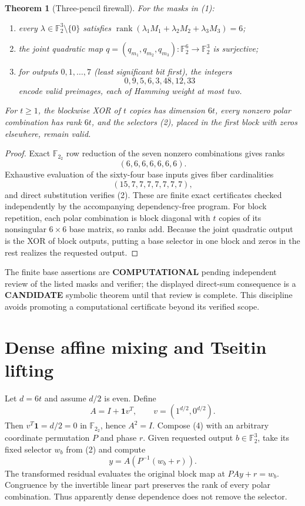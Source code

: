 \documentclass[11pt]{article}
\newtheorem{theorem}{Theorem}
\newcommand{\F}{\mathbb F_2}
\newcommand{\COMP}{\textbf{COMPUTATIONAL}}
\newcommand{\CAND}{\textbf{CANDIDATE}}
\begin{document}
\begin{theorem}[Three-pencil firewall]
For the masks in (1):
\begin{enumerate}
\item every $\lambda\in\F^3\setminus\{0\}$ satisfies
$\operatorname{rank}(\lambda_1M_1+\lambda_2M_2+\lambda_3M_3)=6$;
\item the joint quadratic map
$q=(q_{m_1},q_{m_2},q_{m_3}):\F^6\to\F^3$ is surjective;
\item for outputs $0,1,\ldots,7$ (least significant bit first), the integers
\[
 0,9,5,6,3,48,12,33                                      \tag{2}
\]
encode valid preimages, each of Hamming weight at most two.
\end{enumerate}
For $t\ge1$, the blockwise XOR of $t$ copies has dimension $6t$, every
nonzero polar combination has rank $6t$, and the selectors (2), placed in
the first block with zeros elsewhere, remain valid.
\end{theorem}
\begin{proof}
Exact $\F_2$ row reduction of the seven nonzero combinations gives ranks
\[
 (6,6,6,6,6,6,6).
\]
Exhaustive evaluation of the sixty-four base inputs gives fiber cardinalities
\[
 (15,7,7,7,7,7,7,7),                                    \tag{3}
\]
and direct substitution verifies (2).  These are finite exact certificates
checked independently by the accompanying dependency-free program.  For
block repetition, each polar combination is block diagonal with $t$ copies
of its nonsingular $6\times6$ base matrix, so ranks add.  Because the joint
quadratic output is the XOR of block outputs, putting a base selector in one
block and zeros in the rest realizes the requested output.
\end{proof}

The finite base assertions are \COMP{} pending independent review of the
listed masks and verifier; the displayed direct-sum consequence is a
\CAND{} symbolic theorem until that review is complete.  This discipline
avoids promoting a computational certificate beyond its verified scope.

\section{Dense affine mixing and Tseitin lifting}
Let $d=6t$ and assume $d/2$ is even.  Define
\[
 A=I+\mathbf 1v^T,
 \qquad v=(1^{d/2},0^{d/2}).                              \tag{4}
\]
Then $v^T\mathbf1=d/2=0$ in $\F_2$, hence $A^2=I$.  Compose (4) with an
arbitrary coordinate permutation $P$ and phase $r$.  Given requested output
$b\in\F^3$, take its fixed selector $w_b$ from (2) and compute
\[
 y=A(P^{-1}(w_b+r)).                                      \tag{5}
\]
The transformed residual evaluates the original block map at $PAy+r=w_b$.
Congruence by the invertible linear part preserves the rank of every polar
combination.  Thus apparently dense dependence does not remove the selector.
\end{document}
